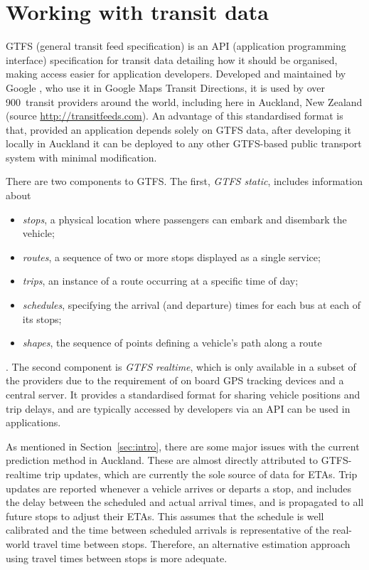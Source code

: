 \section{Working with \rt transit data}
\label{sec:gtfs}

GTFS (general transit feed specification)
is an API (application programming interface) specification for transit data
detailing how it should be organised,
making access easier for application developers.
Developed and maintained by Google \citep{GoogleDevelopers_2006},
who use it in Google Maps Transit Directions,
it is used by over 900~transit providers around the world,
including here in Auckland, New Zealand
(source \url{http://transitfeeds.com}).
An advantage of this standardised format is that,
provided an application depends solely on GTFS data,
after developing it locally in Auckland it can be deployed to any other GTFS-based
public transport system with minimal modification.


There are two components to GTFS.
The first, \emph{GTFS static}, includes information about
\begin{itemize}
\item \emph{stops}, a physical location where passengers can embark and disembark the vehicle;
\item \emph{routes}, a sequence of two or more stops displayed as a single service;
\item \emph{trips}, an instance of a route occurring at a specific time of day;
\item \emph{schedules}, specifying the arrival (and departure) times for each bus at each of its stops; 
\item \emph{shapes}, the sequence of points defining a vehicle's path along a route
\end{itemize}
\citep{GoogleDevelopers_2006}.
The second component is \emph{GTFS realtime},
which is only available in a subset of the providers due to the requirement of 
on board GPS tracking devices and a central server.
It provides a standardised format for sharing vehicle positions and trip delays,
and are typically accessed by developers via an API can be used in \rt applications.

As mentioned in Section~\ref{sec:intro},
there are some major issues with the current prediction method in Auckland.
These are almost directly attributed to GTFS-realtime trip updates,
which are currently the sole source of data for ETAs.
Trip updates are reported whenever a vehicle arrives or departs a stop,
and includes the delay between the scheduled and actual arrival times,
and is propagated to all future stops to adjust their ETAs.
This assumes that the schedule is well calibrated and the time between scheduled arrivals
is representative of the real-world travel time between stops. 
Therefore, an alternative estimation approach using \rt travel times 
between stops is more adequate.



